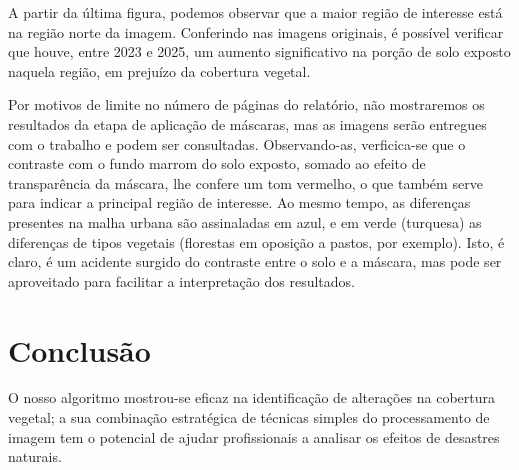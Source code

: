 \documentclass{article}
\begin{document}
A partir da última figura, podemos observar que a maior região de interesse está na região norte da imagem. Conferindo nas imagens originais, é possível verificar que houve, entre 2023 e 2025, um aumento significativo na porção de solo exposto naquela região, em prejuízo da cobertura vegetal.

Por motivos de limite no número de páginas do relatório, não mostraremos os resultados da etapa de aplicação de máscaras, mas as imagens serão entregues com o trabalho e podem ser consultadas. Observando-as, verficica-se que o contraste com o fundo marrom do solo exposto, somado ao efeito de transparência da máscara, lhe confere um tom vermelho, o que também serve para indicar a principal região de interesse. Ao mesmo tempo, as diferenças presentes na malha urbana são assinaladas em azul, e em verde (turquesa) as diferenças de tipos vegetais (florestas em oposição a pastos, por exemplo). Isto, é claro, é um acidente surgido do contraste entre o solo e a máscara, mas pode ser aproveitado para facilitar a interpretação dos resultados.

\section{Conclusão}

O nosso algoritmo mostrou-se eficaz na identificação de alterações na cobertura vegetal; a sua combinação estratégica de técnicas simples do processamento de imagem tem o potencial de ajudar profissionais a analisar os efeitos de desastres naturais.



\end{document}
